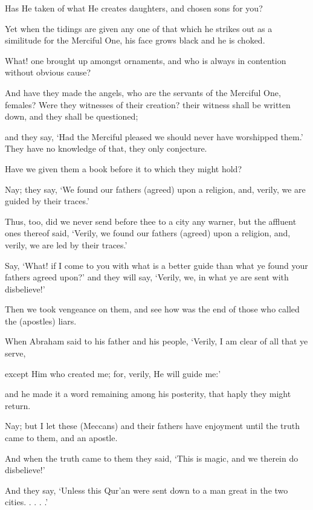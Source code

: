 \documentclass[fontsize=14pt, letterpaper, notitlepage, openany, DIV=12]{scrbook} %
\begin{document}
\noindent[43:16]
Has He taken of what He creates daughters, and chosen sons for you?

\noindent[43:17]
Yet when the tidings are given any one of that which he strikes out as a similitude for the
Merciful One, his face grows black and he is choked.

\noindent[43:18]
What! one brought up amongst ornaments, and who is always in contention without
obvious cause?

\noindent[43:19]
And have they made the angels, who are the servants of the Merciful One, females? Were
they witnesses of their creation? their witness shall be written down, and they shall be
questioned;

\noindent[43:20]
and they say, `Had the Merciful pleased we should never have worshipped them.' They
have no knowledge of that, they only conjecture.

\noindent[43:21]
Have we given them a book before it to which they might hold?

\noindent[43:22]
Nay; they say, `We found our fathers (agreed) upon a religion, and, verily, we are guided
by their traces.'

\noindent[43:23]
Thus, too, did we never send before thee to a city any warner, but the affluent ones
thereof said, `Verily, we found our fathers (agreed) upon a religion, and, verily, we are led by
their traces.'

\noindent[43:24]
Say, `What! if I come to you with what is a better guide than what ye found your fathers
agreed upon?' and they will say, `Verily, we, in what ye are sent with disbelieve!'

\noindent[43:25]
Then we took vengeance on them, and see how was the end of those who called the
(apostles) liars.

\noindent[43:26]
When Abraham said to his father and his people, `Verily, I am clear of all that ye serve,

\noindent[43:27]
except Him who created me; for, verily, He will guide me:'

\noindent[43:28]
and he made it a word remaining among his posterity, that haply they might return.

\noindent[43:29]
Nay; but I let these (Meccans) and their fathers have enjoyment until the truth came to
them, and an apostle.

\noindent[43:30]
And when the truth came to them they said, `This is magic, and we therein do
disbelieve!'

\noindent[43:31]
And they say, `Unless this Qur'an were sent down to a man great in the two cities. . . . .'
\end{document}
